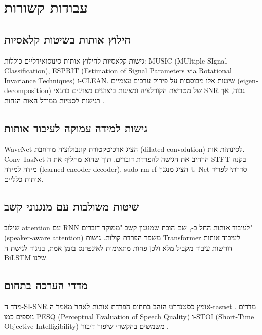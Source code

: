 
\clearpage
\chapter{עבודות קשורות}

\section{חילוץ אותות בשיטות קלאסיות}

גישות קלאסיות לחילוץ אותות סינוסואידליים כוללות: \textenglish{MUSIC} (\textenglish{MUltiple SIgnal Classification}), \textenglish{ESPRIT} (\textenglish{Estimation of Signal Parameters via Rotational Invariance Techniques}) ו-\textenglish{CLEAN}. שיטות אלו מבוססות על פירוק ערכים עצמיים (\textenglish{eigendecomposition}) של מטריצת הקורלציה ומציגות ביצועים מצוינים בתנאי \textenglish{SNR} גבוה, אך רגישות לסטיות ממודל האות הנחות \cite{williamson2016complex}.

\section{גישות למידה עמוקה לעיבוד אותות}

\textenglish{WaveNet} \cite{engel2017wavenet} הציג ארכיטקטורת קונבולוציה מורחבת (\textenglish{dilated convolution}) לסינתזת אות. \textenglish{Conv-TasNet} \cite{luo2019convtasnet} הרחיב את הגישה להפרדת דוברים, תוך שהוא מחליף את ה-\textenglish{STFT} בקנה מידה למידה (\textenglish{learned encoder-decoder}). \textenglish{sudo rm-rf} \cite{tzinis2020universal} הציג מנגנון \textenglish{U-Net} סדרתי לפריד אותות כלליים.

\section{שיטות משולבות עם מנגנוני קשב}

שילוב \textenglish{attention} עם \textenglish{RNN} לעיבוד אותות החל ב-\cite{nachmani2020voice}, שם הוכח שמנגנון קשב "ממוקד דוברים" (\textenglish{speaker-aware attention}) משפר הפרדת קולות. גישות \textenglish{Transformer} לעיבוד אותות \cite{vaswani2017attention} דורשות עיבוד מקביל מלא ולכן פחות מתאימות לאינפרנס בזמן אמת, בניגוד לגישת ה-\textenglish{BiLSTM} שלנו.

\section{מדדי הערכה בתחום}

מדד ה-\textenglish{SI-SNR} אומץ כסטנדרט הזהב בתחום הפרדת אותות לאחר מאמר ה-\textenglish{tasnet} \cite{luo2019convtasnet}. מדדים נוספים כמו \textenglish{PESQ} (\textenglish{Perceptual Evaluation of Speech Quality}) ו-\textenglish{STOI} (\textenglish{Short-Time Objective Intelligibility}) משמשים בהקשרי שיפור דיבור \cite{valentini2019speech}.


